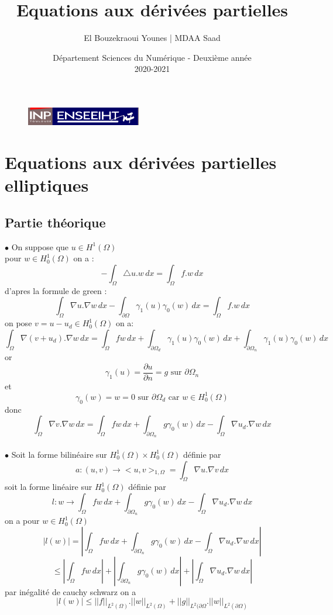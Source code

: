 \documentclass{article}
\begin{document}
\begin{figure}[t]
\centering
\includegraphics[width=5cm]{inp_n7.png}
\end{figure}

\title{\vspace{4cm} \textbf{Equations aux dérivées partielles}}
\author{El Bouzekraoui Younes | MDAA Saad}
\date{\vspace{7cm} Département Sciences du Numérique - Deuxième année \\
2020-2021 }

\maketitle

\newpage
\tableofcontents

\newpage
\section{Equations aux dérivées partielles elliptiques}
\subsection{Partie théorique}
$\bullet$ On suppose que $u \in H^{1}(\Omega)$ \\
pour $w \in H_{0}^{1}(\Omega)$ on a :
$$
- \int_{\Omega} \triangle u . w \,dx = \int_{\Omega} f . w \,dx
$$
d'apres la formule de green :
$$
\int_{\Omega} \nabla u . \nabla w \,dx - \int_{\partial \Omega} \gamma_{1}(u) \gamma_{0}(w) \,dx = \int_{\Omega} f . w \,dx
$$
on pose $v = u - u_d \in H_{0}^{1}(\Omega)$ on a:
$$
\int_{\Omega} \nabla (v + u_d) . \nabla w \,dx  = \int_{\Omega} f w \,dx + \int_{\partial \Omega_{d}} \gamma_{1}(u) \gamma_{0}(w) \,dx + \int_{\partial \Omega_{n}} \gamma_{1}(u) \gamma_{0}(w) \,dx 
$$
or 
$$
\gamma_1(u) = \frac{\partial u}{\partial n} = g \textrm{ sur } \partial \Omega_{n}
$$
et
$$
\gamma_0(w) = w = 0 \textrm{ sur } \partial \Omega_{d} \textrm{ car } w \in H_{0}^{1}(\Omega)
$$
donc 
$$
\boxed{\int_{\Omega} \nabla v . \nabla w \,dx = \int_{\Omega} f w \,dx + \int_{\partial \Omega_{n}} g \gamma_{0}(w) \,dx - \int_{\Omega} \nabla u_d . \nabla w \,dx}
$$
\\
$\bullet$ Soit la forme bilinéaire sur $H_{0}^{1}(\Omega) \times H_{0}^{1}(\Omega)$ définie par 
$$
a : (u, v) \rightarrow <u, v>_{1, \Omega} =  \int_{\Omega} \nabla u . \nabla v \,dx
$$
soit la forme linéaire sur $H_{0}^{1}(\Omega)$ définie par
$$
l : w \rightarrow \int_{\Omega} f w \,dx + \int_{\partial \Omega_{n}} g \gamma_{0}(w) \,dx - \int_{\Omega} \nabla u_d . \nabla w \,dx
$$
on a pour $w \in H_{0}^{1}(\Omega)$
$$
|l(w)| = |\int_{\Omega} f w \,dx + \int_{\partial \Omega_{n}} g \gamma_{0}(w) \,dx - \int_{\Omega} \nabla u_d . \nabla w \,dx|
$$
$$
\leq |\int_{\Omega} f w \,dx| + |\int_{\partial \Omega_{n}} g \gamma_{0}(w) \,dx| + |\int_{\Omega} \nabla u_d . \nabla w \,dx|
$$
par inégalité de cauchy schwarz on a 
$$
|l(w)| \leq ||f||_{L^2(\Omega)} . ||w||_{L^2(\Omega)} + ||g||_{L^2(\partial \Omega} . ||w||_{L^2(\partial \Omega)}
$$
\end{document}
